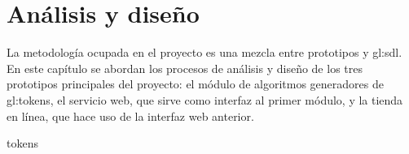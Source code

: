 %
%

\chapter{Análisis y diseño}
\label{sec:analisis_y_disenio}

La metodología ocupada en el proyecto es una mezcla entre prototipos y
\gls{gl:sdl}. En este capítulo se abordan los procesos de análisis y
diseño de los tres prototipos principales del proyecto: el módulo de
algoritmos generadores de \glspl{gl:token}, el servicio web, que sirve
como interfaz al primer módulo, y la tienda en línea, que hace uso de
la interfaz web anterior.

{tokens}
